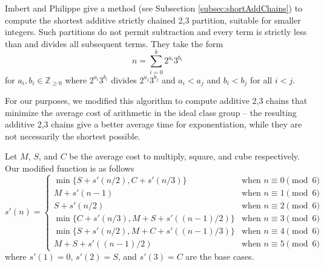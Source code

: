 \documentclass{ucalgthes1}
\theoremstyle{definition}
\newcommand{\ZZgez}{\mathbb{Z}_{\ge 0}}
\begin{document}
Imbert and Philippe \cite{Imbert2010b} give a method (see Subsection \ref{subsec:shortAddChains}) to compute the shortest additive strictly chained 2,3 partition, suitable for smaller integers.  Such partitions do not permit subtraction and every term is strictly less than and divides all subsequent terms. They take the form
\[
	n = \sum_{i=0}^k 2^{a_i}3^{b_i}
\]
for $a_i, b_i \in \ZZgez$ where $2^{a_i}3^{b_i}$ divides $2^{a_j}3^{b_j}$ and $a_i < a_j$ and $b_i < b_j$ for all $i < j$.

For our purposes, we modified this algorithm to compute additive 2,3 chains that minimize the average cost of arithmetic in the ideal class group -- the resulting additive 2,3 chains give a better average time for exponentiation, while they are not necessarily the shortest possible.  

Let $M$, $S$, and $C$ be the average cost to multiply, square, and cube respectively. Our modified function is as follows
\begin{equation*}
s'(n) = \begin{cases}
	\min\{S + s'(n/2), C + s'(n/3)\} & \textrm{when } n \equiv 0 \pmod 6 \\
	M + s'(n-1) & \textrm{when } n \equiv 1 \pmod 6 \\
	S + s'(n/2) & \textrm{when } n \equiv 2 \pmod 6 \\
	\min\{C + s'(n/3), M + S + s'((n-1)/2)\} & \textrm{when } n \equiv 3 \pmod 6 \\
	\min\{S + s'(n/2), M + C + s'((n-1)/3)\} & \textrm{when } n \equiv 4 \pmod 6 \\
	M + S + s'((n-1)/2) & \textrm{when } n \equiv 5 \pmod 6
\end{cases}
\end{equation*}
where $s'(1) = 0$, $s'(2) = S$, and $s'(3) = C$ are the base cases.
\end{document}
